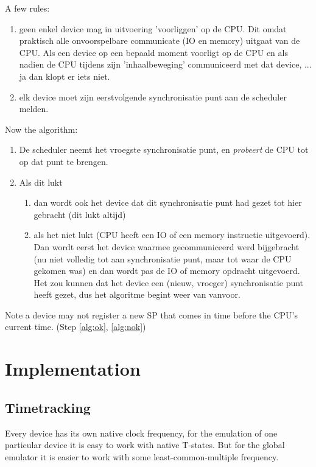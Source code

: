 \documentclass[11pt, a4paper]{report}
\begin{document}
A few rules:
\begin{enumerate}
\item %
geen enkel device mag in uitvoering 'voorliggen' op de CPU.
Dit omdat praktisch alle onvoorspelbare communicate (IO en memory) uitgaat
van de CPU. Als een device op een bepaald moment voorligt op de CPU en als 
nadien de CPU tijdens zijn 'inhaalbeweging' communiceerd met dat device, ...
ja dan klopt er iets niet.

\item %
elk device moet zijn eerstvolgende synchronisatie punt 
aan de scheduler melden.
\end{enumerate}

Now the algorithm:
\begin{enumerate}
\item De scheduler neemt het vroegste synchronisatie punt, en \textit{probeert}
de CPU tot op dat punt te brengen.
\item Als dit lukt
	\begin{enumerate}
	\item \label{alg:ok} 
	dan wordt ook het device dat dit synchronisatie punt had gezet tot
	hier gebracht (dit lukt altijd)
	\item \label{alg:nok}
	als het niet lukt (CPU heeft een IO of een memory instructie
	uitgevoerd). Dan wordt eerst het device waarmee gecommuniceerd
	werd bijgebracht (nu niet volledig tot aan synchronisatie punt, maar tot
	waar de CPU gekomen was) en dan wordt pas de IO of memory opdracht 
	uitgevoerd. Het zou kunnen dat het device een (nieuw, vroeger) 
	synchronisatie punt heeft gezet, dus het algoritme begint weer van 
	vanvoor.
	\end{enumerate}
\end{enumerate}

Note a device may not register a new SP that comes in time before the CPU's
current time. (Step \ref{alg:ok}, \ref{alg:nok})




\chapter{Implementation}

\section{Timetracking}

Every device has its own native clock frequency, for the emulation of one
particular device it is easy to work with native T-states. But for the
global emulator it is easier to work with some least-common-multiple frequency.
\end{document}
